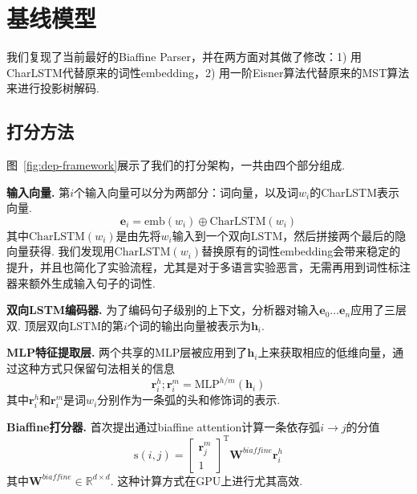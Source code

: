 \section{基线模型}
\label{sec:dep-basic-model}

我们复现了当前最好的Biaffine Parser\cite{dozat-etal-2017-biaffine}，并在两方面对其做了修改：1) 用CharLSTM代替原来的词性embedding，2) 用一阶Eisner算法\cite{eisner-2000-iwptbook}代替原来的MST算法来进行投影树解码.

\subsection{打分方法}
图~\ref{fig:dep-framework}展示了我们的打分架构，一共由四个部分组成.

\textbf{输入向量.}
第$i$个输入向量可以分为两部分：词向量，以及词$w_i$的CharLSTM表示向量.
\begin{equation}
    \label{eq:input}
    \mathbf{e}_i=\mathrm{emb}({w_i}) \oplus \mathrm{CharLSTM}(w_i)
\end{equation}
其中$\mathrm{CharLSTM}(w_i)$是由先将$w_i$输入到一个双向LSTM，然后拼接两个最后的隐向量获得\cite{lample-etal-2016-neural}.
我们发现用$\mathrm{CharLSTM}(w_i)$替换原有的词性embedding会带来稳定的提升，并且也简化了实验流程，尤其是对于多语言实验恶言，无需再用到词性标注器来额外生成输入句子的词性.

\noindent\textbf{双向LSTM编码器.}
为了编码句子级别的上下文，分析器对输入$\mathbf{e}_0 \dots \mathbf{e}_n$应用了三层双.
顶层双向LSTM的第$i$个词的输出向量被表示为$\mathbf{h}_i$.

\noindent\textbf{MLP特征提取层.}
两个共享的MLP层被应用到了$\mathbf{h}_i$上来获取相应的低维向量，通过这种方式只保留句法相关的信息
\begin{equation}
    \label{mlp-arc}
    \mathbf{r}_i^{h}; \mathbf{r}_i^{m} =\mathrm{MLP}^{h/m} \left( \mathbf{h}_i \right)
\end{equation}
其中$\mathbf{r}_i^{h}$和$\mathbf{r}_i^{m}$是词$w_i$分别作为一条弧的头和修饰词的表示.

\noindent\textbf{Biaffine打分器.}
\cite{dozat-etal-2017-biaffine}首次提出通过biaffine attention计算一条依存弧$i \rightarrow j$的分值
\begin{equation} \label{eq:biaffine}
    \mathrm{s}(i,j) =  \left[
        \begin{array}{c}
            \mathbf{r}_{j}^{m} \\
            1
        \end{array}
        \right]^\mathrm{T}
    \mathbf{W}^\textit{biaffine}  \mathbf{r}_{i}^{h}
\end{equation}
其中$\mathbf{W}^\textit{biaffine} \in \mathbb{R}^{d \times d}$.
这种计算方式在GPU上进行尤其高效.

